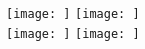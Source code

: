 
\begin{figure}[H]
\centering
	\subcaptionbox%
	{\label{subfig:}}%
		{\texttt{[image: ]}}%
\hfill
	\subcaptionbox%
		{\label{subfig:}}%
		{\texttt{[image: ]}}%
\\[\vbtwsfig]
	\subcaptionbox%
		{\label{subfig:}}%
		{\texttt{[image: ]}}%
\hfill
	\subcaptionbox%
		{\label{subfig:}}%
		{\texttt{[image: ]}}%
\caption%
{}
\label{fig:}
\end{figure}
